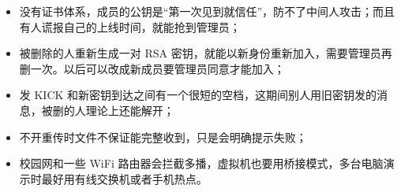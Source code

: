 \documentclass[a4paper,zihao=-4]{ctexart}
\begin{document}
\begin{itemize}
  \item 没有证书体系，成员的公钥是“第一次见到就信任”，防不了中间人攻击；而且有人谎报自己的上线时间，就能抢到管理员；
  \item 被删除的人重新生成一对 RSA 密钥，就能以新身份重新加入，需要管理员再删一次。以后可以改成新成员要管理员同意才能加入；
  \item 发 KICK 和新密钥到达之间有一个很短的空档，这期间别人用旧密钥发的消息，被删的人理论上还能解开；
  \item 不开重传时文件不保证能完整收到，只是会明确提示失败；
  \item 校园网和一些 WiFi 路由器会拦截多播，虚拟机也要用桥接模式，多台电脑演示时最好用有线交换机或者手机热点。
\end{itemize}
\end{document}
